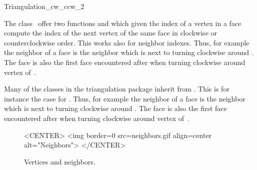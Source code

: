 

\begin{ccRefClass}{Triangulation_cw_ccw_2}  %


\ccDefinition
  
The class \ccRefName\ 
offer  two functions  and 
which given the index of a vertex in a face
compute the index of the next vertex  of the same face
in clockwise
or counterclockwise order.
This works also for neighbor indexes.
 Thus, for example the neighbor 
 of a face  is
 the
neighbor  which is next to  turning clockwise
around \ccc{f}. The face 
is also the first face encountered after  when
turning clockwise around vertex 
of~\ccc{f}.

Many of the classes in the triangulation package
inherit from \ccRefName. This is for instance the case for
.
 Thus, for example the neighbor 
 of a face  is
 the
neighbor  which is next to  turning clockwise
around \ccc{f}. The face 
is also the first face encountered after  when
turning clockwise around vertex 
of~\ccc{f}.



 \begin{figure}
\begin{ccTexOnly}
    \begin{center}
     
    \end{center}
\end{ccTexOnly} 
    \caption{Vertices and neighbors.
    \label{Triangulation_ref_Fig_neighbors_bis}}
  \begin{ccHtmlOnly}
<CENTER>
<img border=0 src=neighbors.gif align=center alt="Neighbors">
</CENTER>
\end{ccHtmlOnly} 
\end{figure}


\end{ccRefClass}
